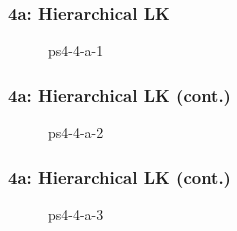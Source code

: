 \documentclass[../report.tex]{subfiles}
\begin{document}
    
    \begin{frame}
        \frametitle{4a: Hierarchical LK}
        \begin{figure}[!htb]
            \centering
            \caption{ps4-4-a-1}
        \end{figure}
    \end{frame}

    \begin{frame}
        \frametitle{4a: Hierarchical LK (cont.)}
        \begin{figure}[!htb]
            \centering
            \caption{ps4-4-a-2}
        \end{figure}
    \end{frame}

    \begin{frame}
        \frametitle{4a: Hierarchical LK (cont.)}
        \begin{figure}[!htb]
            \centering
            \caption{ps4-4-a-3}
        \end{figure}
    \end{frame}
\end{document}
